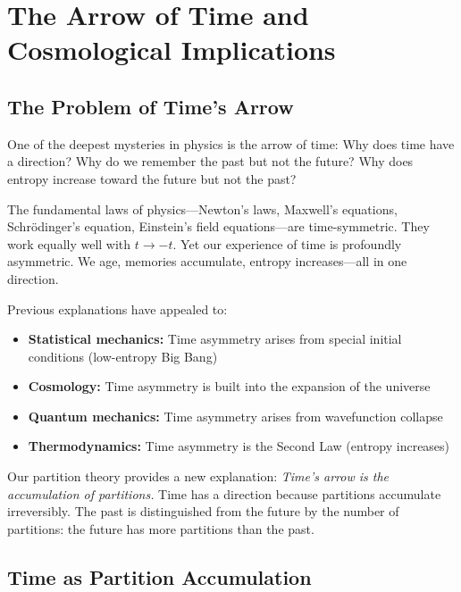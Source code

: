 \documentclass[twocolumn,10pt]{article}
\theoremstyle{definition}
\theoremstyle{remark}
\begin{document}
\section{The Arrow of Time and Cosmological Implications}
\label{sec:arrow_of_time}

\subsection{The Problem of Time's Arrow}

One of the deepest mysteries in physics is the arrow of time: Why does time have a direction? Why do we remember the past but not the future? Why does entropy increase toward the future but not the past?

\vspace{0.2cm}
\noindent The fundamental laws of physics—Newton's laws, Maxwell's equations, Schrödinger's equation, Einstein's field equations—are time-symmetric. They work equally well with $t \to -t$. Yet our experience of time is profoundly asymmetric. We age, memories accumulate, entropy increases—all in one direction.

\vspace{0.2cm}
\noindent Previous explanations have appealed to:
\begin{itemize}
\item \textbf{Statistical mechanics:} Time asymmetry arises from special initial conditions (low-entropy Big Bang)\cite{penrose1989}
\item \textbf{Cosmology:} Time asymmetry is built into the expansion of the universe\cite{gold1962}
\item \textbf{Quantum mechanics:} Time asymmetry arises from wavefunction collapse\cite{penrose1996}
\item \textbf{Thermodynamics:} Time asymmetry is the Second Law (entropy increases)\cite{eddington1928}
\end{itemize}

\noindent Our partition theory provides a new explanation: \textit{Time's arrow is the accumulation of partitions.} Time has a direction because partitions accumulate irreversibly. The past is distinguished from the future by the number of partitions: the future has more partitions than the past.

\subsection{Time as Partition Accumulation}
\end{document}
